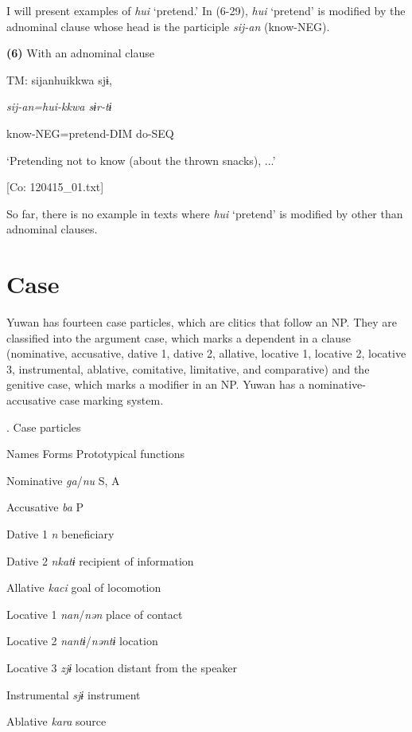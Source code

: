 I will present examples of \textit{hui} ‘pretend.’ In (6-29), \textit{hui} ‘pretend’ is modified by the adnominal clause whose head is the participle \textit{sij-an} (know-NEG).

\textbf{(6)}  With an adnominal clause

  TM:  sijanhuikkwa  sjɨ,

    \textit{sij-an=hui{}-kkwa  sɨr-tɨ}

    know-NEG=pretend-DIM  do-SEQ

    ‘Pretending not to know (about the thrown snacks), ...’

    [Co: 120415\_01.txt]

So far, there is no example in texts where \textit{hui} ‘pretend’ is modified by other than adnominal clauses.

\section{ Case}

Yuwan has fourteen case particles, which are clitics that follow an NP. They are classified into the argument case, which marks a dependent in a clause (nominative, accusative, dative 1, dative 2, allative, locative 1, locative 2, locative 3, instrumental, ablative, comitative, limitative, and comparative) and the genitive case, which marks a modifier in an NP. Yuwan has a nominative-accusative case marking system.

\begin{styleBeschriftung}
\textmd{. Case particles}
\end{styleBeschriftung}

Names  Forms  Prototypical functions

Nominative  \textit{ga}/\textit{nu}  S, A

Accusative  \textit{ba}  P

Dative 1  \textit{n}  beneficiary

Dative 2  \textit{nkatɨ}  recipient of information

Allative  \textit{kaci}  goal of locomotion

Locative 1  \textit{nan}/\textit{nən}  place of contact

Locative 2  \textit{nantɨ}/\textit{nəntɨ}  location

Locative 3  \textit{zjɨ}  location distant from the speaker

Instrumental  \textit{sjɨ}  instrument

Ablative  \textit{kara}  source

